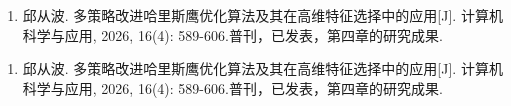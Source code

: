 \documentclass{wzuthesis}
\begin{document}
\ifdefined\blind  %
    \begin{enumerate}
        \renewcommand{\labelenumi}{[\arabic{enumi}]}
        \setlength{\itemindent}{0em}
        \setlength{\labelsep}{0.5em}
  
        \item 邱从波. 多策略改进哈里斯鹰优化算法及其在高维特征选择中的应用[J]. 计算机科学与应用, 2026, 16(4): 589-606.普刊，已发表，第四章的研究成果.
    \end{enumerate}
\else
    \begin{enumerate}
        \renewcommand{\labelenumi}{[\arabic{enumi}]}
        \setlength{\itemindent}{0em}
        \setlength{\labelsep}{0.5em}
  
        \item 邱从波. 多策略改进哈里斯鹰优化算法及其在高维特征选择中的应用[J]. 计算机科学与应用, 2026, 16(4): 589-606.普刊，已发表，第四章的研究成果.
    \end{enumerate}
\fi





\end{document}
